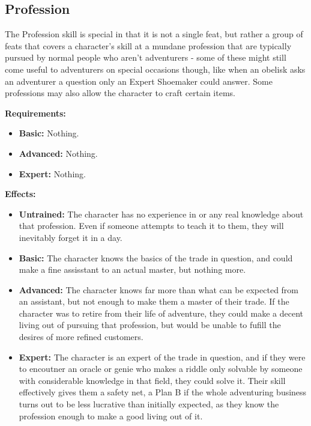 \subsection{Profession}
The Profession skill is special in that it is not a single feat, but rather a group of feats that covers a character's skill at a mundane profession that are typically pursued by normal people who aren't adventurers - some of these might still come useful to adventurers on special occasions though, like when an obelisk asks an adventurer a question only an Expert Shoemaker could answer. Some professions may also allow the character to craft certain items.


\textbf{Requirements:}
\begin{itemize}
	\item \textbf{Basic:} Nothing.
	\item \textbf{Advanced:} Nothing.
	\item \textbf{Expert:} Nothing.
\end{itemize}
\textbf{Effects:}
\begin{itemize}
	\item \textbf{Untrained:} The character has no experience in or any real knowledge about that profession. Even if someone attempts to teach it to them, they will inevitably forget it in a day.
	\item \textbf{Basic:} The character knows the basics of the trade in question, and could make a fine assisstant to an actual master, but nothing more.
	\item \textbf{Advanced:} The character knows far more than what can be expected from an assistant, but not enough to make them a master of their trade. If the character was to retire from their life of adventure, they could make a decent living out of pursuing that profession, but would be unable to fufill the desires of more refined customers.
	\item \textbf{Expert:} The character is an expert of the trade in question, and if they were to encoutner an oracle or genie who makes a riddle only solvable by someone with considerable knowledge in that field, they could solve it. Their skill effectively gives them a safety net, a Plan B if the whole adventuring business turns out to be less lucrative than initially expected, as they know the profession enough to make a good living out of it.
\end{itemize}\newpage
